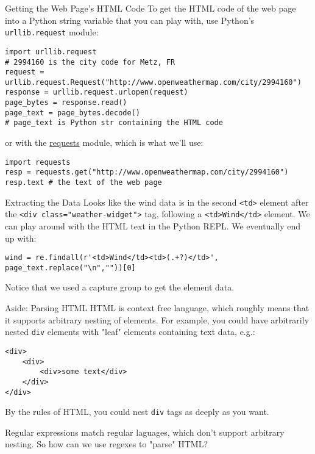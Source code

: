\documentclass[smaller]{beamer}
\begin{document}
\begin{frame}[fragile,label=sec-1-5]{Getting the Web Page's HTML Code}
 To get the HTML code of the web page into a Python string variable that you can play with, use Python's \verb~urllib.request~ module:

\lstset{language=Python,label= ,caption= ,numbers=none}
\begin{lstlisting}
import urllib.request
# 2994160 is the city code for Metz, FR
request = urllib.request.Request("http://www.openweathermap.com/city/2994160")
response = urllib.request.urlopen(request)
page_bytes = response.read()
page_text = page_bytes.decode()
# page_text is Python str containing the HTML code
\end{lstlisting}

or with the \href{http://docs.python-requests.org/en/master/}{requests} module, which is what we'll use:

\lstset{language=Python,label= ,caption= ,numbers=none}
\begin{lstlisting}
import requests
resp = requests.get("http://www.openweathermap.com/city/2994160")
resp.text # the text of the web page
\end{lstlisting}
\end{frame}

\begin{frame}[fragile,label=sec-1-6]{Extracting the Data}
 Looks like the wind data is in the second \verb~<td>~ element after the \verb~<div class="weather-widget">~ tag, following a \verb~<td>Wind</td>~ element. We can play around with the HTML text in the Python REPL. We eventually end up with:

\lstset{language=Python,label= ,caption= ,numbers=none}
\begin{lstlisting}
wind = re.findall(r'<td>Wind</td><td>(.+?)</td>', page_text.replace("\n",""))[0]
\end{lstlisting}

Notice that we used a capture group to get the element data.
\end{frame}

\begin{frame}[fragile,label=sec-1-7]{Aside: Parsing HTML}
 HTML is context free language, which roughly means that it supports arbitrary nesting of elements. For example, you could have arbitrarily nested \verb~div~ elements with "leaf" elements containing text data, e.g.:

\lstset{language=HTML,label= ,caption= ,numbers=none}
\begin{lstlisting}
<div>
    <div>
        <div>some text</div>
    </div>
</div>
\end{lstlisting}

By the rules of HTML, you could nest \verb~div~ tags as deeply as you want.

Regular expressions match regular laguages, which don't support arbitrary nesting. So how can we use regexes to "parse" HTML?
\end{frame}
\end{document}
